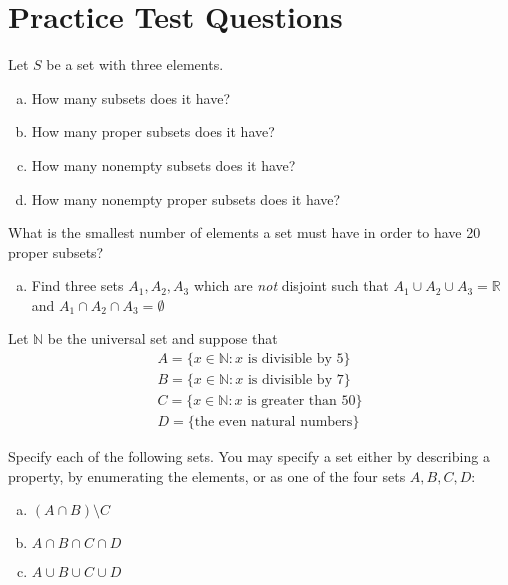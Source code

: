 \chapter{Practice Test Questions}\label{TestPractice}


\begin{exercise}
Let $S$ be a set with three elements.
\begin{enumerate}[(a)]
\item
How many subsets does it have?
\item
How many proper subsets does it have?
\item
How many nonempty subsets does it have?
\item
How many nonempty proper subsets does it have?
\end{enumerate}
\end{exercise}

\begin{exercise}\label{exercise:TestPractice:7}
What is the smallest number of elements a set must have in order to have 20 proper subsets?
\end{exercise}

\begin{exercise}\label{exercise:TestPractice:12}
\begin{enumerate}[(a)]
\item
Find three sets $A_1, A_2, A_3$ which are \emph{not} disjoint such that $A_{1} \cup A_2 \cup A_3 = {\mathbb R}$ and $A_{1} \cap A_2 \cap A_3 = \emptyset$
\end{enumerate}
\end{exercise}

\begin{exercise}\label{exercise:TestPractice:20}
Let ${\mathbb N}$ be the universal set and suppose that
\begin{align*}
A = \{ x \in {\mathbb N} : x \text{ is divisible by 5}\} \\ 
B = \{ x \in {\mathbb N} : x \text{ is divisible by 7}\} \\ 
C = \{ x \in {\mathbb N} : x \text{ is greater than 50}\} \\
D = \{\text{the even natural numbers}\}
\end{align*} 

\noindent
Specify each of the following sets. You may specify a set either by describing a property, by enumerating the elements, or as one of the four sets $A, B, C, D$:
\begin{enumerate}[(a)]
\item
$(A \cap B) \setminus C$
\item
$A \cap B \cap C \cap D$
\item
$A \cup B \cup C \cup D$

\end{enumerate}
\end{exercise}

